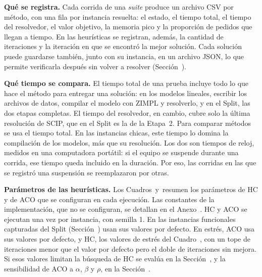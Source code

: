 {\bf Qué se registra.} Cada corrida de una {\em suite} produce un archivo CSV por
método, con una fila por instancia resuelta: el estado, el tiempo total, el tiempo del
resolvedor, el valor objetivo, la memoria pico y la proporción de pedidos
que llegan a tiempo. En las heurísticas se registran, además, la cantidad de
iteraciones y la iteración en que se encontró la mejor solución. Cada
solución puede guardarse también, junto con su instancia, en un archivo
JSON, lo que permite verificarla después sin volver a resolver
(Sección~).

{\bf Qué tiempo se compara.} El tiempo total de una prueba incluye todo lo
que hace el método para entregar una solución: en los modelos lineales,
escribir los archivos de datos, compilar el modelo con ZIMPL y resolverlo, y
en el Split, las dos etapas completas. El tiempo del resolvedor, en cambio,
cubre solo la última resolución de SCIP, que en el Split es la de la
Etapa~2. Para comparar métodos se usa el tiempo total. En las instancias
chicas, este tiempo lo domina la compilación de los modelos, más que su
resolución. Los dos son tiempos de reloj, medidos en una computadora
portátil: si el equipo se suspende durante una corrida, ese tiempo queda
incluido en la duración. Por eso, las corridas en las que se registró una
suspensión se reemplazaron por otras.

{\bf Parámetros de las heurísticas.} Los Cuadros~
y~ resumen los parámetros de HC y de ACO que se
configuran en cada ejecución. Las constantes de la implementación, que no se
configuran, se detallan en el Anexo~. HC y ACO se
ejecutan una vez por instancia, con semilla 1. En las instancias funcionales
capturadas del Split (Sección~) usan sus valores
por defecto. En estrés, ACO usa sus valores por defecto, y HC, los valores
de estrés del Cuadro~, con un tope de iteraciones menor
que el valor por defecto pero el doble de iteraciones sin mejora. Si esos
valores limitan la búsqueda de HC se evalúa en la
Sección~, y la sensibilidad de ACO a $\alpha$,
$\beta$ y $\rho$, en la Sección~.

